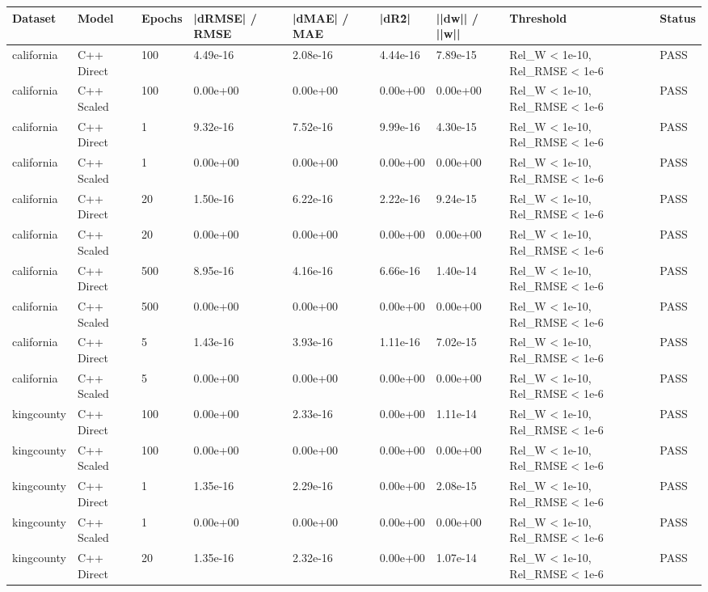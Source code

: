 \begin{table}[htbp]
\centering
\begin{tabular}{lllllllll}
\toprule
Dataset & Model & Epochs & |dRMSE| / RMSE & |dMAE| / MAE & |dR\^2| & ||dw|| / ||w|| & Threshold & Status \\
\midrule
california & C++ Direct & 100 & 4.49e-16 & 2.08e-16 & 4.44e-16 & 7.89e-15 & Rel\_W < 1e-10, Rel\_RMSE < 1e-6 & PASS \\
california & C++ Scaled & 100 & 0.00e+00 & 0.00e+00 & 0.00e+00 & 0.00e+00 & Rel\_W < 1e-10, Rel\_RMSE < 1e-6 & PASS \\
california & C++ Direct & 1 & 9.32e-16 & 7.52e-16 & 9.99e-16 & 4.30e-15 & Rel\_W < 1e-10, Rel\_RMSE < 1e-6 & PASS \\
california & C++ Scaled & 1 & 0.00e+00 & 0.00e+00 & 0.00e+00 & 0.00e+00 & Rel\_W < 1e-10, Rel\_RMSE < 1e-6 & PASS \\
california & C++ Direct & 20 & 1.50e-16 & 6.22e-16 & 2.22e-16 & 9.24e-15 & Rel\_W < 1e-10, Rel\_RMSE < 1e-6 & PASS \\
california & C++ Scaled & 20 & 0.00e+00 & 0.00e+00 & 0.00e+00 & 0.00e+00 & Rel\_W < 1e-10, Rel\_RMSE < 1e-6 & PASS \\
california & C++ Direct & 500 & 8.95e-16 & 4.16e-16 & 6.66e-16 & 1.40e-14 & Rel\_W < 1e-10, Rel\_RMSE < 1e-6 & PASS \\
california & C++ Scaled & 500 & 0.00e+00 & 0.00e+00 & 0.00e+00 & 0.00e+00 & Rel\_W < 1e-10, Rel\_RMSE < 1e-6 & PASS \\
california & C++ Direct & 5 & 1.43e-16 & 3.93e-16 & 1.11e-16 & 7.02e-15 & Rel\_W < 1e-10, Rel\_RMSE < 1e-6 & PASS \\
california & C++ Scaled & 5 & 0.00e+00 & 0.00e+00 & 0.00e+00 & 0.00e+00 & Rel\_W < 1e-10, Rel\_RMSE < 1e-6 & PASS \\
kingcounty & C++ Direct & 100 & 0.00e+00 & 2.33e-16 & 0.00e+00 & 1.11e-14 & Rel\_W < 1e-10, Rel\_RMSE < 1e-6 & PASS \\
kingcounty & C++ Scaled & 100 & 0.00e+00 & 0.00e+00 & 0.00e+00 & 0.00e+00 & Rel\_W < 1e-10, Rel\_RMSE < 1e-6 & PASS \\
kingcounty & C++ Direct & 1 & 1.35e-16 & 2.29e-16 & 0.00e+00 & 2.08e-15 & Rel\_W < 1e-10, Rel\_RMSE < 1e-6 & PASS \\
kingcounty & C++ Scaled & 1 & 0.00e+00 & 0.00e+00 & 0.00e+00 & 0.00e+00 & Rel\_W < 1e-10, Rel\_RMSE < 1e-6 & PASS \\
kingcounty & C++ Direct & 20 & 1.35e-16 & 2.32e-16 & 0.00e+00 & 1.07e-14 & Rel\_W < 1e-10, Rel\_RMSE < 1e-6 & PASS \\

\end{tabular}
\end{table}
